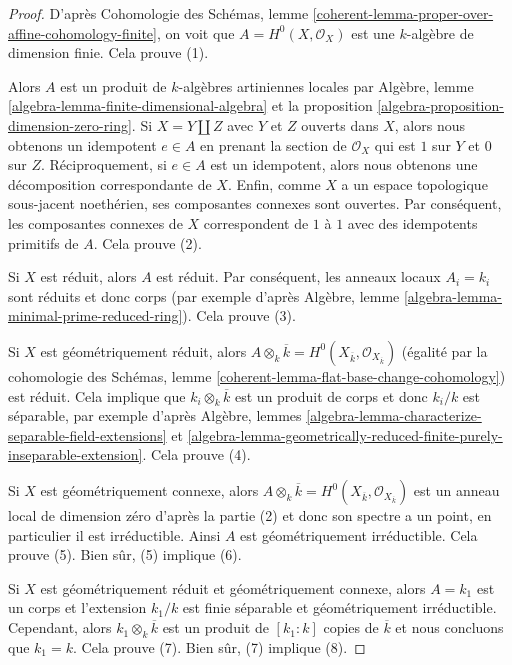\begin{proof}
D'après Cohomologie des Schémas, lemme
\ref{coherent-lemma-proper-over-affine-cohomology-finite},
on voit que $A = H^0(X, \mathcal{O}_X)$ est
une $k$-algèbre de dimension finie. Cela prouve (1).

\medskip\noindent
Alors $A$ est un produit de $k$-algèbres artiniennes locales par
Algèbre, lemme
\ref{algebra-lemma-finite-dimensional-algebra} et la proposition
\ref{algebra-proposition-dimension-zero-ring}. Si $X = Y \amalg Z$
avec $Y$ et $Z$ ouverts dans $X$, alors nous obtenons un idempotent $e
\in A$ en prenant la section de $\mathcal{O}_X$ qui est $1$ sur $Y$ et
$0$ sur $Z$. Réciproquement, si $e \in A$ est un idempotent, alors nous
obtenons une décomposition correspondante de $X$. Enfin, comme $X$ a un
espace topologique sous-jacent noethérien, ses composantes connexes
sont ouvertes. Par conséquent, les composantes connexes de $X$
correspondent de $1$ à $1$ avec des idempotents primitifs de $A$. Cela prouve (2).

\medskip\noindent
Si $X$ est réduit, alors $A$ est réduit. Par
conséquent, les anneaux locaux $A_i = k_i$ sont réduits
et donc corps (par exemple d'après Algèbre, lemme
\ref{algebra-lemma-minimal-prime-reduced-ring}). Cela prouve (3).

\medskip\noindent
Si $X$ est géométriquement réduit, alors $A
\otimes_k \overline{k} = H^0(X_{\overline{k}},
\mathcal{O}_{X_{\overline{k}}})$ (égalité par la
cohomologie des Schémas, lemme
\ref{coherent-lemma-flat-base-change-cohomology})
est réduit. Cela implique que $k_i \otimes_k
\overline{k}$ est un produit de corps et donc $k_i/k$
est séparable, par exemple d'après Algèbre, lemmes
\ref{algebra-lemma-characterize-separable-field-extensions}
et
\ref{algebra-lemma-geometrically-reduced-finite-purely-inseparable-extension}. Cela prouve (4).

\medskip\noindent
Si $X$ est géométriquement connexe, alors $A \otimes_k
\overline{k} = H^0(X_{\overline{k}},
\mathcal{O}_{X_{\overline{k}}})$ est un anneau local de
dimension zéro d'après la partie (2) et donc son spectre a un
point, en particulier il est irréductible. Ainsi $A$ est
géométriquement irréductible. Cela prouve (5). Bien sûr, (5) implique (6).

\medskip\noindent
Si $X$ est géométriquement réduit et géométriquement connexe, alors
$A = k_1$ est un corps et l'extension $k_1/k$ est finie séparable et
géométriquement irréductible. Cependant, alors $k_1 \otimes_k
\overline{k}$ est un produit de $[k_1 : k]$ copies de $\overline{k}$ et
nous concluons que $k_1 = k$. Cela prouve (7). Bien sûr, (7) implique (8).
\end{proof}

